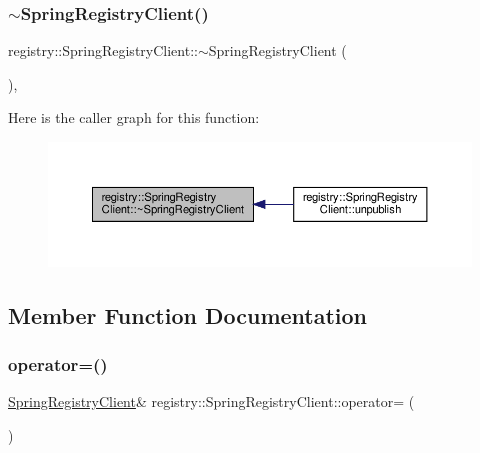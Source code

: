 \subsubsection{\texorpdfstring{$\sim$\+Spring\+Registry\+Client()}{~SpringRegistryClient()}}
{\footnotesize\ttfamily registry\+::\+Spring\+Registry\+Client\+::$\sim$\+Spring\+Registry\+Client (\begin{DoxyParamCaption}{ }\end{DoxyParamCaption})\hspace{0.3cm}{\ttfamily [default]}, {\ttfamily [noexcept]}}

Here is the caller graph for this function\+:\nopagebreak
\begin{figure}[H]
\begin{center}
\leavevmode
\includegraphics[width=350pt]{classregistry_1_1SpringRegistryClient_a4289550a022eee1ba06b32fdb529e9d1_icgraph}
\end{center}
\end{figure}


\subsection{Member Function Documentation}
\mbox{\label{classregistry_1_1SpringRegistryClient_a7e1ae35762aee96920b92d2ef3000809}} 
\subsubsection{\texorpdfstring{operator=()}{operator=()}\hspace{0.1cm}{\footnotesize\ttfamily [1/2]}}
{\footnotesize\ttfamily \hyperlink{classregistry_1_1SpringRegistryClient}{Spring\+Registry\+Client}\& registry\+::\+Spring\+Registry\+Client\+::operator= (\begin{DoxyParamCaption}\item[{\hyperlink{classregistry_1_1SpringRegistryClient}{Spring\+Registry\+Client} const \&}]{ }\end{DoxyParamCaption})\hspace{0.3cm}{\ttfamily [delete]}}

